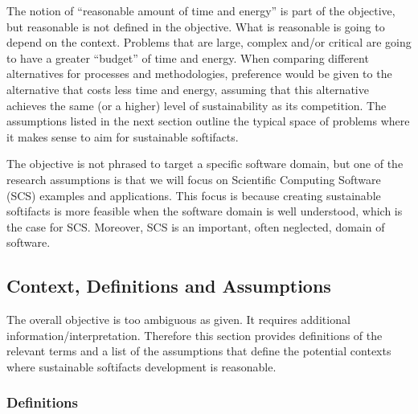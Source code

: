 \documentclass[12pt]{article}
\begin{document}
The notion of ``reasonable amount of time and energy'' is part of the objective,
but reasonable is not defined in the objective.  What is reasonable is going to
depend on the context.  Problems that are large, complex and/or critical are
going to have a greater ``budget'' of time and energy.  When comparing different
alternatives for processes and methodologies, preference would be given to the
alternative that costs less time and energy, assuming that this alternative
achieves the same (or a higher) level of sustainability as its competition.  The
assumptions listed in the next section outline the typical space of problems
where it makes sense to aim for sustainable softifacts.

The objective is not phrased to target a specific software domain, but one of
the research assumptions is that we will focus on Scientific Computing Software
(SCS) examples and applications.  This focus is because creating sustainable
softifacts is more feasible when the software domain is well understood,
which is the case for SCS.  Moreover, SCS is an important, often neglected,
domain of software.

\subsection*{Context, Definitions and Assumptions}

The overall objective is too ambiguous as given.  It requires additional
information/interpretation.  Therefore this section provides definitions of the
relevant terms and a list of the assumptions that define the potential contexts
where sustainable softifacts development is reasonable.

\subsubsection*{Definitions}
\end{document}
